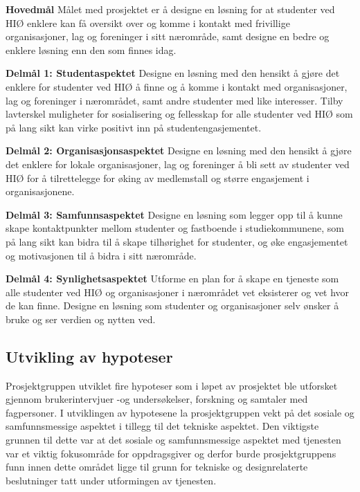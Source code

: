 \begin{compactitem}
\item [{\bf Hovedmål}] Målet med prosjektet er å designe en løsning for at studenter ved HIØ enklere kan få oversikt over og komme i kontakt med frivillige organisasjoner, lag og foreninger i sitt nærområde, samt designe en bedre og enklere løsning enn den som finnes idag.
\begin{compactitem}
\item [{\bf  Delmål 1: Studentaspektet} ] Designe en løsning med den hensikt å gjøre det enklere for studenter ved HIØ å finne og å komme i kontakt med organisasjoner, lag og foreninger i nærområdet, samt andre studenter med like interesser. Tilby lavterskel muligheter for sosialisering og fellesskap for alle studenter ved HIØ som på lang sikt kan virke positivt inn på studentengasjementet.
\item [{\bf  Delmål 2: Organisasjonsaspektet} ] Designe en løsning med den hensikt å gjøre det enklere for lokale organisasjoner, lag og foreninger å bli sett av studenter ved HIØ for å tilrettelegge for øking av medlemstall og større engasjement i organisasjonene.
\item [{\bf  Delmål 3: Samfunnsaspektet} ] Designe en løsning som legger opp til å kunne skape kontaktpunkter mellom studenter og fastboende i studiekommunene, som på lang sikt kan bidra til å skape tilhørighet for studenter, og øke engasjementet og motivasjonen til å bidra i sitt nærområde.
\item [{\bf  Delmål 4: Synlighetsaspektet} ] Utforme en plan for å skape en tjeneste som alle studenter ved HIØ og organisasjoner i nærområdet vet eksisterer og vet hvor de kan finne. Designe en løsning som studenter og organisasjoner selv ønsker å bruke og ser verdien og nytten ved.
\end{compactitem} 
\end{compactitem}

\subsection{Utvikling av hypoteser}
\label{section:hypoteser}
Prosjektgruppen utviklet fire hypoteser som i løpet av prosjektet ble utforsket gjennom brukerintervjuer -og undersøkelser, forskning og samtaler med fagpersoner. I utviklingen av hypotesene la prosjektgruppen vekt på det sosiale og samfunnsmessige aspektet i tillegg til det tekniske aspektet. Den viktigste grunnen til dette var at det sosiale og samfunnsmessige aspektet med tjenesten var et viktig fokusområde for oppdragsgiver og derfor burde prosjektgruppens funn innen dette området ligge til grunn for tekniske og designrelaterte beslutninger tatt under utformingen av tjenesten.

